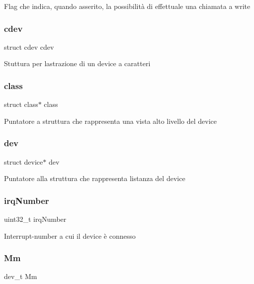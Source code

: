 Flag che indica, quando asserito, la possibilità di effettuale una chiamata a write \mbox{\label{structUART_acba682fe45d5a1501790dbdb1d99bd6a}} 
\subsubsection{\texorpdfstring{cdev}{cdev}}
{\footnotesize\ttfamily struct cdev cdev}

Stuttura per l\textquotesingle{}astrazione di un device a caratteri \mbox{\label{structUART_a9b6474dd18270738a5c4853fd93b5e70}} 
\subsubsection{\texorpdfstring{class}{class}}
{\footnotesize\ttfamily struct class$\ast$ class}

Puntatore a struttura che rappresenta una vista alto livello del device \mbox{\label{structUART_acf6a82c73e7a9d99293d9ce0b8837faf}} 
\subsubsection{\texorpdfstring{dev}{dev}}
{\footnotesize\ttfamily struct device$\ast$ dev}

Puntatore alla struttura che rappresenta l\textquotesingle{}istanza del device \mbox{\label{structUART_a42a1593ebe61611c4e29413903a373a5}} 
\subsubsection{\texorpdfstring{irq\+Number}{irqNumber}}
{\footnotesize\ttfamily uint32\+\_\+t irq\+Number}

Interrupt-\/number a cui il device è connesso \mbox{\label{structUART_aeb60fb4e41b5f11f70ebe969361884f4}} 
\subsubsection{\texorpdfstring{Mm}{Mm}}
{\footnotesize\ttfamily dev\+\_\+t Mm}

